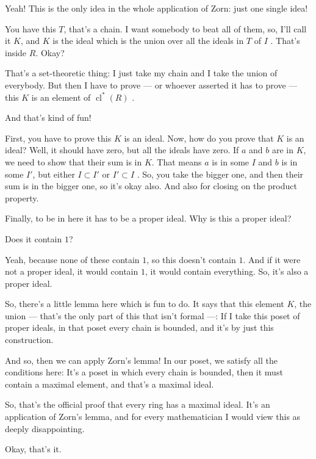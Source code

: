 \begin{speech}[00:42:54 - 00:44:24]
Yeah! This is the only idea in the whole application of Zorn: just one single idea!

You have this $T$, that's a chain. I want somebody to beat all of them, so, I'll call it $K$, and $K$ is the ideal which is the union over all the ideals in $T$ of $I$ . That's inside $R$. Okay?

That's a set-theoretic thing: I just take my chain and I take the union of everybody. But then I have to prove --- or whoever asserted it has to prove --- this $K$ is an element of $\operatorname{cl}^*(R)$ .

And that's kind of fun!

First, you have to prove this $K$ is an ideal. Now, how do you prove that $K$ is an ideal? Well, it should have zero, but all the ideals have zero. If $a$ and $b$ are in $K$, we need to show that their sum is in $K$. That means $a$ is in some $I$ and $b$ is in some $I'$, but either $I \subset I'$ or $I' \subset I$ . So, you take the bigger one, and then their sum is in the bigger one, so it's okay also. And also for closing on the product property.

Finally, to be in here it has to be a proper ideal. Why is this a proper ideal?
\end{speech}

\begin{student}
Does it contain $1$?
\end{student}

\begin{speech}[00:44:26 - 00:45:20]
Yeah, because none of these contain $1$, so this doesn't contain $1$. And if it were not a proper ideal, it would contain $1$, it would contain everything. So, it's also a proper ideal.

So, there's a little lemma here which is fun to do. It says that this element $K$, the union --- that's the only part of this that isn't formal ---: If I take this poset of proper ideals, in that poset every chain is bounded, and it's by just this construction.

And so, then we can apply Zorn's lemma! In our poset, we satisfy all the conditions here: It's a poset in which every chain is bounded, then it must contain a maximal element, and that's a maximal ideal.

So, that's the official proof that every ring has a maximal ideal. It's an application of Zorn's lemma, and for every mathematician I would view this as deeply disappointing.

Okay, that's it.
\end{speech}

